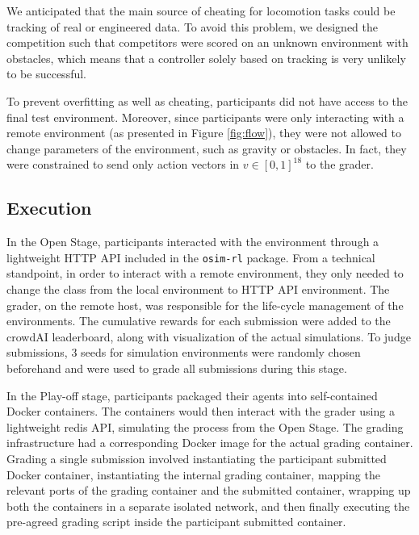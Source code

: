 \documentclass[graybox]{svmult}
\begin{document}

We anticipated that the main source of cheating for locomotion tasks could be tracking of real or engineered data. To avoid this problem, we designed the competition such that competitors were scored on an unknown environment with obstacles, which means that a controller solely based on tracking is very unlikely to be successful.

To prevent overfitting as well as cheating, participants did not have access to the final test environment. Moreover, since participants were only interacting with a remote environment (as presented in Figure \ref{fig:flow}), they were not allowed to change parameters of the environment, such as gravity or obstacles. In fact, they were constrained to send only action vectors in $v \in [0,1]^{18}$ to the grader.

\subsection{Execution}\label{ss:execution}

In the Open Stage, participants interacted with the environment through a lightweight HTTP API included in the \verb|osim-rl| package. From a technical standpoint, in order to interact with a remote environment, they only needed to change the class from the local environment to HTTP API environment. The grader, on the remote host, was responsible for the life-cycle management of the environments. The cumulative rewards for each submission were added to the crowdAI leaderboard, along with visualization of the actual simulations. To judge submissions, 3 seeds for simulation environments were randomly chosen beforehand and were used to grade all submissions during this stage. %

In the Play-off stage, participants packaged their agents into self-contained Docker containers. The containers would then interact with the grader using a lightweight redis API, simulating the process from the Open Stage. The grading infrastructure had a corresponding Docker image for the actual grading container. Grading a single submission involved instantiating the participant submitted Docker container, instantiating the internal grading container, mapping the relevant ports of the grading container and the submitted container, wrapping up both the containers in a separate isolated network, and then finally executing the pre-agreed grading script inside the participant submitted container.
\end{document}

